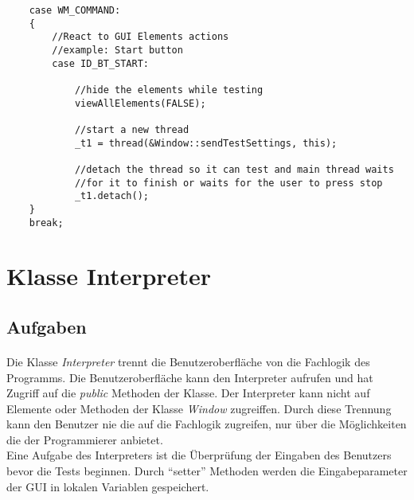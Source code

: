 \begin{lstlisting}	 
	case WM_COMMAND:
	{
		//React to GUI Elements actions
		//example: Start button
		case ID_BT_START:

			//hide the elements while testing
			viewAllElements(FALSE);

			//start a new thread
			_t1 = thread(&Window::sendTestSettings, this);

			//detach the thread so it can test and main thread waits
			//for it to finish or waits for the user to press stop
			_t1.detach();
	}
    break;
\end{lstlisting}




\newpage

\section{Klasse Interpreter}
\subsection{Aufgaben}
\paragraph{}
Die Klasse \textit{Interpreter} trennt die Benutzeroberfläche von die Fachlogik des Programms. Die Benutzeroberfläche kann den Interpreter aufrufen und hat Zugriff auf die \textit{public} Methoden der Klasse. Der Interpreter kann nicht auf Elemente oder Methoden der Klasse \textit{Window} zugreiffen. Durch diese Trennung kann den Benutzer nie die auf die Fachlogik zugreifen, nur über die Möglichkeiten die der Programmierer anbietet.\\

Eine Aufgabe des Interpreters ist die Überprüfung der Eingaben des Benutzers bevor die Tests beginnen. Durch "`setter"' Methoden werden die Eingabeparameter der GUI in lokalen Variablen gespeichert.\\

